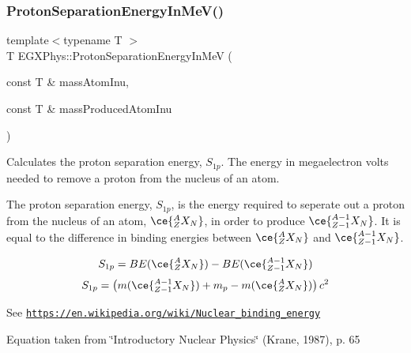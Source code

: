 \subsubsection{\texorpdfstring{Proton\+Separation\+Energy\+In\+Me\+V()}{ProtonSeparationEnergyInMeV()}}
{\footnotesize\ttfamily template$<$typename T $>$ \\
T E\+G\+X\+Phys\+::\+Proton\+Separation\+Energy\+In\+MeV (\begin{DoxyParamCaption}\item[{const T \&}]{mass\+Atom\+Inu,  }\item[{const T \&}]{mass\+Produced\+Atom\+Inu }\end{DoxyParamCaption})}



Calculates the proton separation energy, $S_{1p}$. The energy in megaelectron volts needed to remove a proton from the nucleus of an atom. 

The proton separation energy, $S_{1p}$, is the energy required to seperate out a proton from the nucleus of an atom, $\ce{ ^{A}_{Z}X_{N} }$, in order to produce $\ce{ ^{A-1}_{Z-1}X_{N} }$. It is equal to the difference in binding energies between $\ce{ ^{A}_{Z}X_{N} }$ and $\ce{ ^{A-1}_{Z-1}X_{N} }$.

\[S_{1p} = BE(\ce{ ^{A}_{Z}X_{N} }) - BE(\ce{ ^{A-1}_{Z-1}X_{N} })\] \[S_{1p} = \left ( m(\ce{ ^{A-1}_{Z-1}X_{N} }) + m_p - m(\ce{ ^{A}_{Z}X_{N} }) \right ) c^2\]

See \href{https://en.wikipedia.org/wiki/Nuclear_binding_energy}{\tt https\+://en.\+wikipedia.\+org/wiki/\+Nuclear\+\_\+binding\+\_\+energy}

Equation taken from \char`\"{}\+Introductory Nuclear Physics\char`\"{} (Krane, 1987), p. 65


